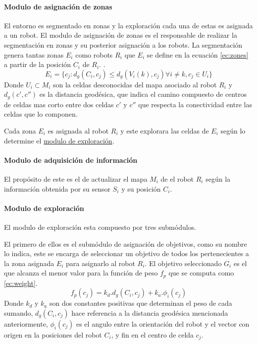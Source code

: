 \paragraph{Modulo de asignación de zonas }
El entorno es segmentado en zonas y la exploración cada una de estas es asignada a un robot. El modulo de asignación de zonas es el responsable de realizar la segmentación en zonas y su posterior asignación a los robots. La segmentación genera tantas zonas $E_i$ como robots $R_i$ que $E_i$ se define en la ecuación \ref{ec:zones} a partir de la posición $C_i$ de $R_i$. .
\begin{equation}\label{ec:zones}
  E_i=\{c_j:d_g(C_i,c_j)\leq d_g(V_i(k),c_j) \forall i \neq k , c_j \in U_i\}
\end{equation}
Donde $U_i \subset M_i$ son la celdas desconocidas del mapa asociado al robot $R_i$ y $d_g(c',c'')$ es la distancia geodésica, que indica el camino compuesto de centros de celdas mas corto entre dos celdas $c'$ y $c''$ que respecta la conectividad entre las celdas que lo componen.

Cada zona $E_i$ es asignada al robot $R_i$ y este explorara las celdas de $E_i$ según lo determine el \hyperref[par:estar:moduloexp]{modulo de exploración}.

\paragraph{Modulo de adquisición de información}
El propósito de este es el de actualizar el mapa $M_i$ de el robot $R_i$ según la información obtenida por su sensor $S_i$ y su posición $C_i$.

\paragraph{Modulo de exploración}\label{par:estar:moduloexp}
El modulo de exploración esta compuesto por tres submódulos. 

El primero de ellos es el submódulo de asignación de objetivos, como su nombre lo indica, este se encarga de seleccionar un objetivo de todos los pertenecientes a la zona asignada $E_i$ para asignarlo al robot $R_i$. El objetivo seleccionado $G_i$ es el que alcanza el menor valor para la función de peso $f_p$ que se computa como \ref{ec:weight}.
\begin{equation}\label{ec:weight}
  f_p(c_j) = k_d.d_g(C_i,c_j) + k_a.\phi_i(c_j)
\end{equation}
Donde $k_d$ y $k_a$ son dos constantes positivas que determinan el peso de cada sumando, $d_g(C_i,c_j)$ hace referencia a la distancia geodésica mencionada anteriormente, $\phi_i(c_j)$ es el angulo entre la orientación del robot y el vector con origen en la posiciones del robot $C_i$, y fin en el centro de celda $c_j$. 

